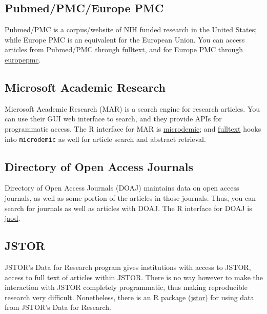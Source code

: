 \documentclass[author-year, review, 11pt]{components/elsarticle} %
\begin{document}
\hypertarget{pubmedpmceurope-pmc}{%
\subsection{Pubmed/PMC/Europe PMC}\label{pubmedpmceurope-pmc}}

Pubmed/PMC is a corpus/website of NIH funded research in the United
States; while Europe PMC is an equivalent for the European Union. You
can access articles from Pubmed/PMC through
\href{https://github.com/ropensci/fulltext}{fulltext}, and for Europe
PMC through \href{https://github.com/ropensci/europepmc}{europepmc}.

\hypertarget{microsoft-academic-research}{%
\subsection{Microsoft Academic
Research}\label{microsoft-academic-research}}

Microsoft Academic Research (MAR) is a search engine for research
articles. You can use their GUI web interface to search, and they
provide APIs for programmatic access. The R interface for MAR is
\href{https://github.com/ropensci/microdemic}{microdemic}; and
\href{https://github.com/ropensci/fulltext}{fulltext} hooks into
\texttt{microdemic} as well for article search and abstract retrieval.

\hypertarget{directory-of-open-access-journals}{%
\subsection{Directory of Open Access
Journals}\label{directory-of-open-access-journals}}

Directory of Open Access Journals (DOAJ) maintains data on open access
journals, as well as some portion of the articles in those journals.
Thus, you can search for journals as well as articles with DOAJ. The R
interface for DOAJ is \href{https://github.com/ropensci/jaod}{jaod}.

\hypertarget{jstor}{%
\subsection{JSTOR}\label{jstor}}

JSTOR's Data for Research program gives institutions with access to
JSTOR, access to full text of articles within JSTOR. There is no way
however to make the interaction with JSTOR completely programmatic, thus
making reproducible research very difficult. Nonetheless, there is an R
package (\href{https://github.com/ropensci/jstor}{jstor}) for using data
from JSTOR's Data for Research.
\end{document}
